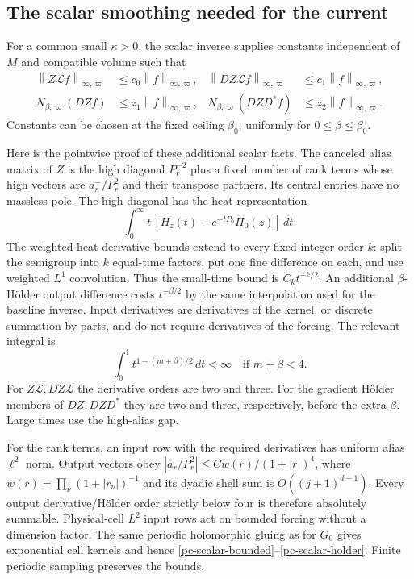 \documentclass[11pt]{article}
\theoremstyle{remark}
\newcommand{\norm}[1]{\left\|#1\right\|}
\begin{document}
\subsection{The scalar smoothing needed for the current}

For a common small $\kappa>0$, the scalar inverse supplies constants
independent of $M$ and compatible volume such that
\begin{align}
 \norm{Z\mathcal L f}_{\infty,\varpi}
       &\le c_0\norm{f}_{\infty,\varpi},&
 \norm{DZ\mathcal L f}_{\infty,\varpi}
       &\le c_1\norm{f}_{\infty,\varpi},
       \label{pc-scalar-bounded}\\
 N_{\beta,\varpi}(DZf)
       &\le z_1\norm{f}_{\infty,\varpi},&
 N_{\beta,\varpi}(DZD^*f)
       &\le z_2\norm{f}_{\infty,\varpi}.
       \label{pc-scalar-holder}
\end{align}
Constants can be chosen at the fixed ceiling $\beta_0$, uniformly
for $0\le\beta\le\beta_0$.

Here is the pointwise proof of these additional scalar facts. The
canceled alias matrix of $Z$ is the high diagonal $P_r^{-2}$ plus
a fixed number of rank terms whose high vectors are $a_r^-/P_r^2$
and their transpose partners. Its central entries have no massless
pole. The high diagonal has the heat representation
\begin{equation}\label{pc-biharmonic-heat}
 \int_0^\infty t\,[H_z(t)-e^{-tP_0}\Pi_0(z)]\,dt.
\end{equation}
The weighted heat derivative bounds extend to every fixed integer
order $k$: split the semigroup into $k$ equal-time factors, put one
fine difference on each, and use weighted $L^1$ convolution.
Thus the small-time bound is $C_kt^{-k/2}$. An additional
$\beta$-H\"older output difference costs $t^{-\beta/2}$ by the
same interpolation used for the baseline inverse. Input derivatives
are derivatives of the kernel, or discrete summation by parts, and
do not require derivatives of the forcing. The relevant integral is
\[
 \int_0^1 t^{1-(m+\beta)/2}\,dt<\infty
                  \quad\text{if }m+\beta<4.
\]
For $Z\mathcal L,DZ\mathcal L$ the derivative orders are two and
three. For the gradient H\"older members of $DZ,DZD^*$ they are
two and three, respectively, before the extra $\beta$. Large times
use the high-alias gap.

For the rank terms, an input row with the required derivatives has
uniform alias $\ell^2$ norm. Output vectors obey
$|a_r/P_r^2|\le Cw(r)/(1+|r|)^4$, where
$w(r)=\prod_\nu(1+|r_\nu|)^{-1}$ and its dyadic shell sum is
$O((j+1)^{d-1})$. Every output derivative/H\"older order strictly
below four is therefore absolutely summable. Physical-cell $L^2$
input rows act on bounded forcing without a dimension factor.
The same periodic holomorphic gluing as for $G_0$ gives exponential
cell kernels and hence \eqref{pc-scalar-bounded}--\eqref{pc-scalar-holder}.
Finite periodic sampling preserves the bounds.
\end{document}
